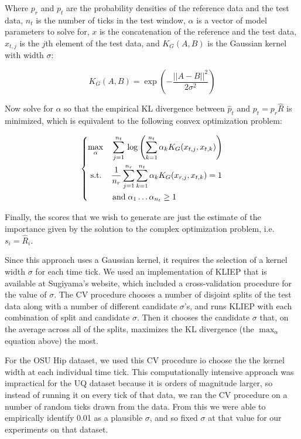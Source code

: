 Where $p_{r}$ and $p_{t}$ are the probability densities of the reference data and the test
data, $n_{t}$ is the number of ticks in the test window, $\alpha$ is a
vector of model parameters to solve for, $x$ is the concatenation of the reference and the
test data, $x_{t,j}$ is the $j$th element of the test data,
and $K_G(A,B)$ is the Gaussian kernel with width $\sigma$:

\[
K_G(A,B) = \exp \left(-\frac{||A-B||^2}{2\sigma^2}\right)
\]

Now solve for $\alpha$ so that the empirical KL divergence between $\hat{p}_{t}$ and
$p_{t} = p_{r}\hat{R}$ is minimized, which is equivalent to the following convex optimization
problem:

\[
\begin{dcases}
 \max_{\alpha} \quad \sum_{j=1}^{n_t} \, \log \left( \sum_{k=1}^{n_t} \alpha_k K_G(x_{t,j}, x_{t,k}) \right) \\
 \,\, \text{s.t.} \quad\, \frac{1}{n_r} \sum_{j=1}^{n_r} \sum_{k=1}^{n_t} \alpha_k K_G(x_{r,j},x_{t,k}) = 1 \\
 \qquad \quad \text{and} \; \alpha_1 \ldots \alpha_{n_t} \ge 1
\end{dcases}
\]

Finally, the scores that we wish to generate are just the estimate of the importance given by the
solution to the complex optimization problem, i.e. $s_i = \hat{R}_i$.

Since this approach uses a Gaussian kernel, it requires the selection of
a kernel width $\sigma$ for each time tick. We used an implementation of
KLIEP that is available at Sugiyama's website, which included a cross-validation
procedure for the value of $\sigma$. The CV procedure chooses a number of disjoint
splits of the test data along with a number of different candidate $\sigma$'s, and runs
KLIEP with each combination of split and candidate $\sigma$. Then it chooses the candidate $\sigma$
that, on the average across all of the splits, maximizes the KL divergence (the
$\max_{\alpha}$ equation above) the most.

For the OSU Hip dataset, we used this CV procedure io choose the the kernel width at each individual time tick. This computationally
intensive approach was impractical for the UQ dataset because it is orders of magnitude larger,
so instead of running it on every tick of that data, we ran the CV procedure on a number of
random ticks drawn from the data. From this we were able
to empirically identify 0.01 as a plausible $\sigma$, and so fixed $\sigma$
at that value for our experiments on that dataset.

